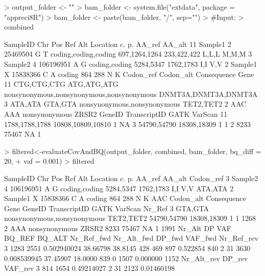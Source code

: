\documentclass{article}
\begin{document}
\begin{Schunk}
\begin{Sinput}
> output_folder <- ""
> bam_folder <- system.file("extdata", package = "appreci8R")
> bam_folder <- paste(bam_folder, "/", sep="")
> #Input:
> combined
\end{Sinput}
\begin{Soutput}
   SampleID Chr       Pos Ref Alt             Location            c.          p. AA_ref AA_alt
11  Sample1   2  25469504   G   T coding,coding,coding 697,1264,1264 233,422,422  L,L,L  M,M,M
3   Sample2   4 106196951   A   G        coding,coding     5284,5347   1762,1783    I,I    V,V
2   Sample1   X  15838366   C   A               coding           864         288      N      K
     Codon_ref   Codon_alt                               Consequence                 Gene
11 CTG,CTG,CTG ATG,ATG,ATG nonsynonymous,nonsynonymous,nonsynonymous DNMT3A,DNMT3A,DNMT3A
3      ATA,ATA     GTA,GTA               nonsynonymous,nonsynonymous            TET2,TET2
2          AAC         AAA                             nonsynonymous                ZRSR2
           GeneID      TranscriptID GATK VarScan
11 1788,1788,1788 10808,10809,10810    1      NA
3     54790,54790       18308,18309    1       1
2            8233             75467   NA       1
\end{Soutput}
\begin{Sinput}
> filtered<-evaluateCovAndBQ(output_folder, combined, bam_folder, bq_diff = 20,
+                            vaf = 0.001)
> filtered
\end{Sinput}
\begin{Soutput}
  SampleID Chr       Pos Ref Alt      Location        c.        p. AA_ref AA_alt Codon_ref
3  Sample2   4 106196951   A   G coding,coding 5284,5347 1762,1783    I,I    V,V   ATA,ATA
2  Sample1   X  15838366   C   A        coding       864       288      N      K       AAC
  Codon_alt                 Consequence      Gene      GeneID TranscriptID GATK VarScan Nr_Ref
3   GTA,GTA nonsynonymous,nonsynonymous TET2,TET2 54790,54790  18308,18309    1       1   1268
2       AAA               nonsynonymous     ZRSR2        8233        75467   NA       1   1991
  Nr_Alt   DP         VAF   BQ_REF  BQ_ALT Nr_Ref_fwd Nr_Alt_fwd DP_fwd  VAF_fwd Nr_Ref_rev
3   1283 2551 0.502940024 38.66798 38.8145        428        469    897 0.522854        840
2     31 3630 0.008539945 37.45907 18.0000        839          0   1507 0.000000       1152
  Nr_Alt_rev DP_rev    VAF_rev
3        814   1654 0.49214027
2         31   2123 0.01460198
\end{Soutput}
\end{Schunk}
\end{document}

